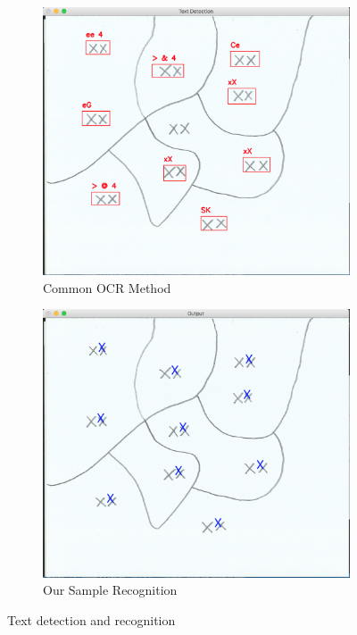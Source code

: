 \documentclass[11pt]{IEEEtran}
\begin{document}
\begin{figure}[h]
     \centering
     \begin{subfigure}[b]{0.4\textwidth}
         \centering
         \includegraphics[width=\textwidth]{ocrprior}
         \caption{Common OCR Method}
         \label{fig:ocrprior}
     \end{subfigure}
     \hfill
     \begin{subfigure}[b]{0.4\textwidth}
         \centering
         \includegraphics[width=\textwidth]{textrec}
         \caption{Our Sample Recognition}
         \label{fig:textrec}
     \end{subfigure}
        \caption{Text detection and recognition}
        \label{fig:texttest}
\end{figure}
\end{document}

